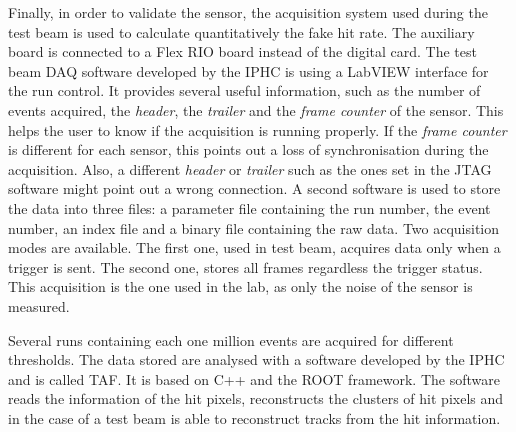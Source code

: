  Finally, in order to validate the sensor, the acquisition system used during the test beam is used to calculate quantitatively the fake hit rate.
  The auxiliary board is connected to a  Flex RIO board instead of the digital card.
  The test beam DAQ software developed by the IPHC is using a LabVIEW interface for the run control.
  It provides several useful information, such as the number of events acquired, the \textit{header}, the \textit{trailer} and the \textit{frame counter} of the sensor.
  This helps the user to know if the acquisition is running properly.
  If the \textit{frame counter} is different for each sensor, this points out a loss of synchronisation during the acquisition.
  Also, a different \textit{header} or \textit{trailer} such as the ones set in the JTAG software might point out a wrong connection.
  A second software is used to store the data into three files: a parameter file containing the run number, the event number, an index file and a binary file containing the raw data.
  Two acquisition modes are available. 
  The first one, used in test beam, acquires data only when a trigger is sent.
  The second one, stores all frames regardless the trigger status. 
  This acquisition is the one used in the lab, as only the noise of the sensor is measured.
   
  Several runs containing each one million events are acquired for different thresholds. 
  The data stored are analysed with a software developed by the IPHC and is called \gls{TAF}\cite{TAF2015}.
  It is based on C++ and the ROOT framework.
  The software reads the information of the hit pixels, reconstructs the clusters of hit pixels and in the case of a test beam is able to reconstruct tracks from the hit information.

